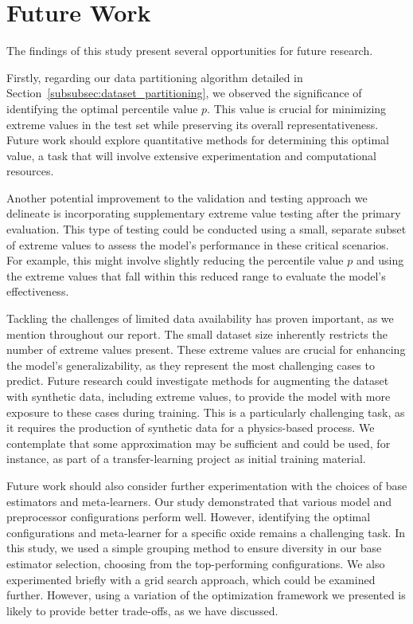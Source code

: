 \section{Future Work}\label{sec:future_work}
The findings of this study present several opportunities for future research.

Firstly, regarding our data partitioning algorithm detailed in Section~\ref{subsubsec:dataset_partitioning}, we observed the significance of identifying the optimal percentile value $p$.
This value is crucial for minimizing extreme values in the test set while preserving its overall representativeness.
Future work should explore quantitative methods for determining this optimal value, a task that will involve extensive experimentation and computational resources.

Another potential improvement to the validation and testing approach we delineate is incorporating supplementary extreme value testing after the primary evaluation.
This type of testing could be conducted using a small, separate subset of extreme values to assess the model's performance in these critical scenarios.
For example, this might involve slightly reducing the percentile value $p$ and using the extreme values that fall within this reduced range to evaluate the model's effectiveness.

Tackling the challenges of limited data availability has proven important, as we mention throughout our report.
The small dataset size inherently restricts the number of extreme values present.
These extreme values are crucial for enhancing the model's generalizability, as they represent the most challenging cases to predict.
Future research could investigate methods for augmenting the dataset with synthetic data, including extreme values, to provide the model with more exposure to these cases during training.
This is a particularly challenging task, as it requires the production of synthetic data for a physics-based process.
We contemplate that some approximation may be sufficient and could be used, for instance, as part of a transfer-learning project as initial training material.

Future work should also consider further experimentation with the choices of base estimators and meta-learners.
Our study demonstrated that various model and preprocessor configurations perform well.
However, identifying the optimal configurations and meta-learner for a specific oxide remains a challenging task.
In this study, we used a simple grouping method to ensure diversity in our base estimator selection, choosing from the top-performing configurations.
We also experimented briefly with a grid search approach, which could be examined further.
However, using a variation of the optimization framework we presented is likely to provide better trade-offs, as we have discussed.